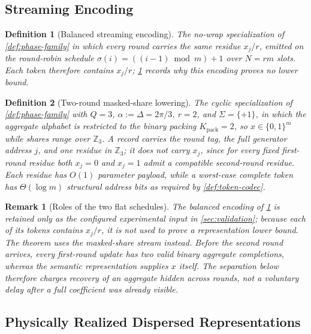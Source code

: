 \documentclass[aps,prx,reprint,floatfix,superscriptaddress]{revtex4-2}
\newtheorem{definition}{Definition}
\newtheorem{remark}{Remark}
\begin{document}
\subsection{Streaming Encoding}

\begin{definition}[Balanced streaming encoding]
\label{def:streaming-encoding}
The no-wrap specialization of \cref{def:phase-family} in which every round
carries the same residue $x_j/r$, emitted on the round-robin schedule
$\sigma(i)=((i-1)\bmod m)+1$ over $N=rm$ slots.  Each token therefore
contains $x_j/r$; \cref{rem:dispersal} records why this encoding proves no
lower bound.
\end{definition}

\begin{definition}[Two-round masked-share lowering]
\label{def:masked-share}
The cyclic specialization of \cref{def:phase-family} with $Q=3$,
$\alpha:=\Delta=2\pi/3$, $r=2$, and $\Sigma=\{+1\}$, in which the
aggregate alphabet is restricted to the binary packing
$K_{\mathrm{pack}}=2$, so $x\in\{0,1\}^m$ while shares range over
$\mathbb Z_3$.  A record carries the round tag, the full generator
address $j$, and one residue in $\mathbb Z_3$; it does not carry $x_j$,
since for every fixed first-round residue both $x_j=0$ and $x_j=1$ admit
a compatible second-round residue.  Each residue has $O(1)$ parameter
payload, while a worst-case complete token has $\Theta(\log m)$
structural address bits as required by \cref{def:token-codec}.
\end{definition}

\begin{remark}[Roles of the two flat schedules]
\label{rem:dispersal}
The balanced encoding of \cref{def:streaming-encoding} is retained only as
the configured experimental input in \cref{sec:validation}; because each
of its tokens contains $x_j/r$, it is not used to prove a representation
lower bound.  The theorem uses the masked-share stream instead.  Before the
second round arrives, every first-round update has two valid binary
aggregate completions, whereas the semantic representation supplies $x$
itself.  The separation below therefore charges recovery of an aggregate
hidden across rounds, not a voluntary delay after a full coefficient was
already visible.
\end{remark}

\subsection{Physically Realized Dispersed Representations}
\label{sec:physical-dispersed}
\end{document}
